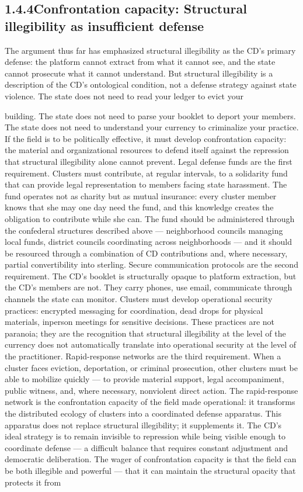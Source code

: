 \subsection{1.4.4\quad Confrontation capacity: Structural illegibility as insufficient defense}

The argument thus far has emphasized structural illegibility as the CD’s primary defense: the platform cannot extract from what it cannot see, and the state cannot prosecute what it cannot understand. But structural illegibility is a description of the CD’s ontological condition, not a defense strategy against state violence. The state does not need to read your ledger to evict your

building. The state does not need to parse your booklet to deport your members. The state does not need to understand your currency to criminalize your practice. If the field is to be politically effective, it must develop confrontation capacity: the material and organizational resources to defend itself against the repression that structural illegibility alone cannot prevent. Legal defense funds are the first requirement. Clusters must contribute, at regular intervals, to a solidarity fund that can provide legal representation to members facing state harassment. The fund operates not as charity but as mutual insurance: every cluster member knows that she may one day need the fund, and this knowledge creates the obligation to contribute while she can. The fund should be administered through the confederal structures described above — neighborhood councils managing local funds, district councils coordinating across neighborhoods — and it should be resourced through a combination of CD contributions and, where necessary, partial convertibility into sterling. Secure communication protocols are the second requirement. The CD’s booklet is structurally opaque to platform extraction, but the CD’s members are not. They carry phones, use email, communicate through channels the state can monitor. Clusters must develop operational security practices: encrypted messaging for coordination, dead drops for physical materials, inperson meetings for sensitive decisions. These practices are not paranoia; they are the recognition that structural illegibility at the level of the currency does not automatically translate into operational security at the level of the practitioner. Rapid-response networks are the third requirement. When a cluster faces eviction, deportation, or criminal prosecution, other clusters must be able to mobilize quickly — to provide material support, legal accompaniment, public witness, and, where necessary, nonviolent direct action. The rapid-response network is the confrontation capacity of the field made operational: it transforms the distributed ecology of clusters into a coordinated defense apparatus. This apparatus does not replace structural illegibility; it supplements it. The CD’s ideal strategy is to remain invisible to repression while being visible enough to coordinate defense — a difficult balance that requires constant adjustment and democratic deliberation. The wager of confrontation capacity is that the field can be both illegible and powerful — that it can maintain the structural opacity that protects it from 